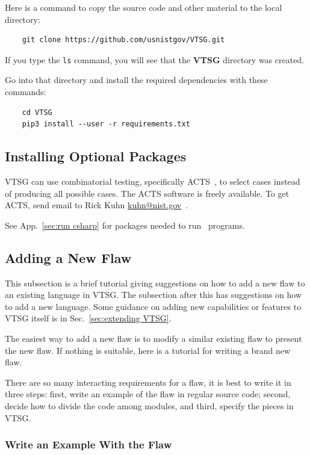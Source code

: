 \noindent Here is a command to copy the source code and other material to the local
directory:

\begin{verbatim}
    git clone https://github.com/usnistgov/VTSG.git
\end{verbatim}

\noindent If you type the \verb|ls| command, you will see that the \textbf{VTSG}
directory was created.

\noindent Go into that directory and install the required dependencies with these
commands:

\begin{verbatim}
    cd VTSG
    pip3 install --user -r requirements.txt
\end{verbatim}

\subsection{Installing Optional Packages}

VTSG can use combinatorial testing, specifically ACTS~\cite{ACTS2013}, to select
cases instead of producing all possible cases.  The ACTS software is freely available.
To get ACTS, send email to Rick Kuhn
\href{mailto:kuhn@nist.gov}{kuhn@nist.gov}~\cite{CombinTesting}.

See App.~\ref{sec:run csharp} for packages needed to run \CSharp\ programs.


\subsection{Adding a New Flaw}
\label{sec:adding a new flaw}

This subsection is a brief tutorial giving suggestions on how to add a new
flaw to an existing language in VTSG.  The subsection after this has suggestions
on how to add a new language.  Some guidance on adding new capabilities or
features to VTSG itself is in Sec.~\ref{sec:extending VTSG}.

The easiest way to add a new flaw is to modify a similar existing flaw to present the
new flaw.  If nothing is suitable, here is a tutorial for writing a brand new flaw.

There are so many interacting requirements for a flaw, it is best to write it in
three steps: first, write an example of the flaw in regular source code; second,
decide how to
divide the code among modules, and third, specify the pieces in VTSG.

\subsubsection{Write an Example With the Flaw}

